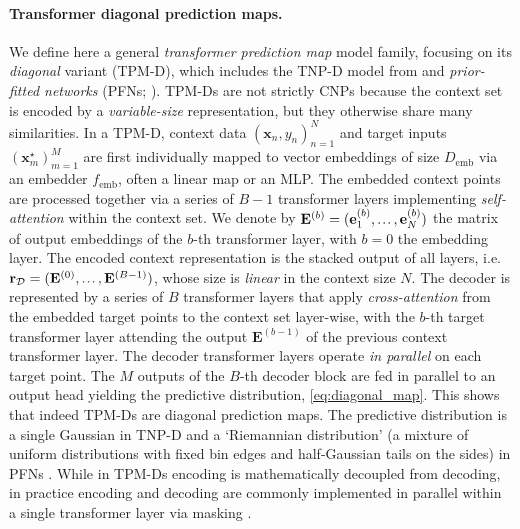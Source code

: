 \documentclass[twoside]{article}
\newcommand{\e}{\mathbf{e}}
\newcommand{\E}{\mathbf{E}}
\renewcommand{\r}{\mathbf{r}}
\renewcommand{\ldots}{\mathinner{.\mkern1.5mu.\mkern1.5mu.}}
\newcommand{\x}{\mathbf{x}}
\newcommand{\data}{\mathcal{D}}
\newcommand{\xt}{\mathbf{x}^\star}
\newcommand{\rt}{\mathbf{r}^\star}
\begin{document}
\paragraph{Transformer diagonal prediction maps.} We define here a general \emph{transformer prediction map} model family, focusing on its \emph{diagonal} variant (TPM-D), which includes the TNP-D model from \citet{nguyen2022transformer} and \emph{prior-fitted networks} (PFNs; \citealp{muller2022transformers}). TPM-Ds are not strictly CNPs because the context set is encoded by a \emph{variable-size} representation, but they otherwise share many similarities.
In a TPM-D, context data $(\x_n, y_n)_{n=1}^N$ and target inputs $(\xt_m)_{m=1}^M$ are first individually mapped to vector embeddings of size $D_\text{emb}$ via an embedder $f_\text{emb}$, often a linear map or an MLP. The embedded context points are processed together via a series of $B-1$ transformer layers implementing \emph{self-attention} within the context set. We denote by $\E^{(b)} = (\e_1^{(b)}, \ldots, \e_N^{(b)})$ the matrix of output embeddings of the $b$-th transformer layer, with $b=0$ the embedding layer. The encoded context representation is the stacked output of all layers, i.e. $\r_{\data} = (\E^{(0)}, \ldots, \E^{(B-1)})$, whose size is \emph{linear} in the context size $N$.
The decoder is represented by a series of $B$ transformer layers that apply \emph{cross-attention} from the embedded target points to the context set layer-wise, with the $b$-th target transformer layer attending the output $\E^{(b-1)}$ of the previous context transformer layer. The decoder transformer layers operate \emph{in parallel} on each target point. The $M$ outputs of the $B$-th decoder block %
are fed in parallel to an output head yielding the predictive distribution, \cref{eq:diagonal_map}. This shows that indeed TPM-Ds are diagonal prediction maps. The predictive distribution is a single Gaussian in TNP-D \citep{nguyen2022transformer} and a `Riemannian distribution' (a mixture of uniform distributions with fixed bin edges and half-Gaussian tails on the sides) in PFNs \citep{muller2022transformers}.
While in TPM-Ds encoding is mathematically decoupled from decoding, in practice encoding and decoding are commonly implemented in parallel within a single transformer layer via masking \citep{nguyen2022transformer, muller2022transformers}. 
\end{document}
